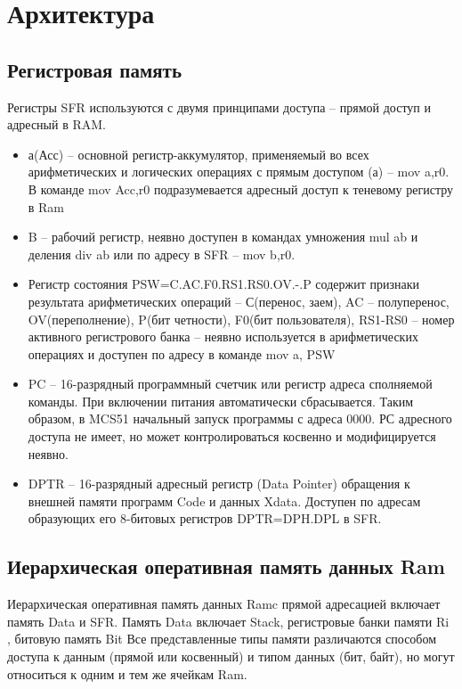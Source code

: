 \documentclass[12pt, a4paper] {ncc}
\begin{document}
\section{Архитектура}
\subsection{Регистровая память}
    Регистры SFR используются с двумя принципами доступа – прямой  доступ  и адресный в RAM.
    \begin{itemize}
        \item а(Асс) -- основной регистр-аккумулятор, применяемый во всех арифметических и логических операциях с
              прямым доступом (а) – mov a,r0. В команде mov Acc,r0 подразумевается адресный доступ
              к теневому регистру в Ram
        \item B -- рабочий регистр, неявно доступен в командах умножения mul ab и деления div ab или по адресу в SFR – mov b,r0.
        \item Регистр состояния PSW=C.AC.F0.RS1.RS0.OV.-.P содержит признаки результата арифметических операций – С(перенос, заем),
              AC -- полуперенос,  OV(переполнение), P(бит четности), F0(бит пользователя), RS1-RS0 -- номер активного регистрового
              банка -- неявно используется в арифметических операциях  и доступен по адресу в команде mov a, PSW
         \item PC -- 16-разрядный программный счетчик или регистр адреса сполняемой команды. При включении питания автоматически сбрасывается.
               Таким образом, в MCS51 начальный запуск программы с адреса  0000.  РС адресного доступа не имеет, но может контролироваться
               косвенно и модифицируется неявно.
         \item DPTR -- 16-разрядный адресный регистр  (Data Pointer) обращения к внешней памяти программ Code и данных Xdata.
               Доступен по адресам образующих его 8-битовых регистров DPTR=DPH.DPL в SFR.
    \end{itemize}
    \subsection{Иерархическая  оперативная  память данных Ram}
        Иерархическая  оперативная  память данных Ramc прямой адресацией включает  память Data и SFR.
        Память Data включает  Stack, регистровые банки памяти Ri , битовую память Bit
        Все представленные  типы памяти различаются способом доступа к данным (прямой или косвенный) и
        типом данных (бит, байт), но могут относиться к одним и тем же ячейкам Ram.
\end{document}
